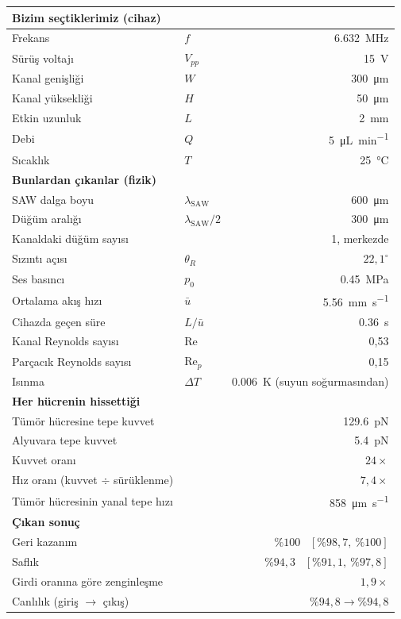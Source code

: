 \documentclass[11pt,a4paper]{article}
\begin{document}
\begin{center}\small
\begin{tabular}{llr}
\toprule
\multicolumn{3}{l}{\textbf{Bizim seçtiklerimiz (cihaz)}}\\
\midrule
Frekans & $f$ & \SI{6,632}{\mega\hertz} \\
Sürüş voltajı & $V_{pp}$ & \SI{15}{\volt} \\
Kanal genişliği & $W$ & \SI{300}{\micro\meter} \\
Kanal yüksekliği & $H$ & \SI{50}{\micro\meter} \\
Etkin uzunluk & $L$ & \SI{2}{\milli\meter} \\
Debi & $Q$ & \SI{5}{\micro\liter\per\minute} \\
Sıcaklık & $T$ & \SI{25}{\celsius} \\
\midrule
\multicolumn{3}{l}{\textbf{Bunlardan çıkanlar (fizik)}}\\
\midrule
SAW dalga boyu & $\lambda_{\text{SAW}}$ & \SI{600}{\micro\meter} \\
Düğüm aralığı & $\lambda_{\text{SAW}}/2$ & \SI{300}{\micro\meter} \\
Kanaldaki düğüm sayısı & & 1, merkezde \\
Sızıntı açısı & $\theta_R$ & $22{,}1^\circ$ \\
Ses basıncı & $p_0$ & \SI{0,45}{\mega\pascal} \\
Ortalama akış hızı & $\bar u$ & \SI{5,56}{\milli\meter\per\second} \\
Cihazda geçen süre & $L/\bar u$ & \SI{0,36}{\second} \\
Kanal Reynolds sayısı & $\mathrm{Re}$ & 0,53 \\
Parçacık Reynolds sayısı & $\mathrm{Re}_p$ & 0,15 \\
Isınma & $\Delta T$ & \SI{0,006}{\kelvin} (suyun soğurmasından) \\
\midrule
\multicolumn{3}{l}{\textbf{Her hücrenin hissettiği}}\\
\midrule
Tümör hücresine tepe kuvvet & & \SI{129,6}{\pico\newton} \\
Alyuvara tepe kuvvet & & \SI{5,4}{\pico\newton} \\
Kuvvet oranı & & $24\times$ \\
Hız oranı (kuvvet $\div$ sürüklenme) & & $7{,}4\times$ \\
Tümör hücresinin yanal tepe hızı & & \SI{858}{\micro\meter\per\second} \\
\midrule
\multicolumn{3}{l}{\textbf{Çıkan sonuç}}\\
\midrule
Geri kazanım & & $\%100$ \ \small$[\%98{,}7,\ \%100]$ \\
Saflık & & $\%94{,}3$ \ \small$[\%91{,}1,\ \%97{,}8]$ \\
Girdi oranına göre zenginleşme & & $1{,}9\times$ \\
Canlılık (giriş $\to$ çıkış) & & $\%94{,}8 \to \%94{,}8$ \\
\bottomrule
\end{tabular}
\end{center}
\end{document}

